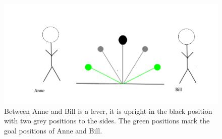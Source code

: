 \begin{figure}[h!]
  \begin{centering}
  \includegraphics[scale=0.5]{figures/pictures/Hebelbild.png}
  \caption{Between Anne and Bill is a lever, it is upright in the black position with two grey positions to the sides. The green positions mark the goal positions of Anne and Bill.
  }
  \label{leverexample}
  \end{centering}
\end{figure}
